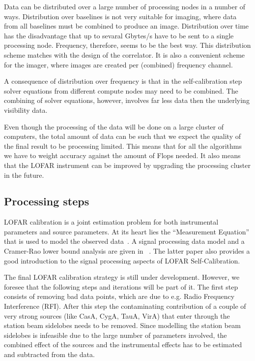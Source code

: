\documentclass[journal]{IEEEtran}
\begin{document}
Data can be distributed over a large number of processing nodes in a number of ways. Distribution over baselines is not very suitable for imaging, where data from all baselines must be combined to produce an image. Distribution over time has the disadvantage that up to sevaral Gbytes/s have to be sent to a single processing node. Frequency, therefore, seems to be the best way. This distribution scheme matches with the design of the correlator. It is also a convenient scheme for the imager, where images are created per (combined) frequency channel. 

A consequence of distribution over frequency is that in the self-calibration step solver equations from different compute nodes may need to be combined. The combining of solver equations, however, involves far less data then the underlying visibility data.   

Even though the processing of the data will be done on a large cluster of computers, the total amount of data can be such that we expect the quality of the final result to be processing limited. This means that for all the algorithms we have to weight accuracy against the amount of Flops needed. It also means that the LOFAR instrument can be improved by upgrading the processing cluster in the future. 

\subsection{Processing steps}

LOFAR calibration is a joint estimation problem for both instrumental parameters and source parameters. At its heart lies the ``Measurement Equation'' that is used to model the observed data~\cite{Hamaker:96}. A signal processing data model and a Cramer-Rao lower bound analysis are given in ~\cite{Tol:07}. The latter paper also provides a good introduction to the signal processing aspects of LOFAR Self-Calibration.   

The final LOFAR calibration strategy is still under development. However, we foresee that the following steps and iterations will be part of it. The first step consists of removing bad data points, which are due to e.g. Radio Frequency Interference (RFI). After this step the contaminating contribution of a couple of very strong sources (like CasA, CygA, TauA, VirA) that enter through the station beam sidelobes needs to be removed. Since modelling the station beam sidelobes is infeasible due to the large number of parameters involved, the combined effect of the sources and the instrumental effects has to be estimated and subtracted from the data. 
\end{document}
